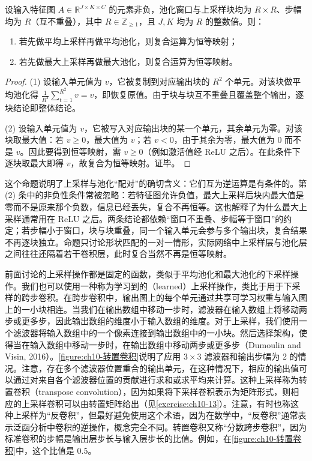 \documentclass[../../main.tex]{subfiles}
\begin{document}
\begin{proposition}[上采样与池化的复合]\label{proposition:ch10-上采样复合}
设输入特征图 $A\in\mathbb{R}^{J\times K\times C}$ 的元素非负，池化窗口与上采样块均为
$R\times R$、步幅均为 $R$（互不重叠），其中 $R\in\mathbb{Z}_{\geqslant1}$，且 $J,K$
均为 $R$ 的整数倍。则：
\begin{enumerate}
  \item 若先做平均上采样再做平均池化，则复合运算为恒等映射；
  \item 若先做最大上采样再做最大池化，则复合运算为恒等映射。
\end{enumerate}
\end{proposition}
\begin{proof}
(1) 设输入单元值为 $v$，它被复制到对应输出块的 $R^2$ 个单元。对该块做平均池化得 $\frac{1}{R^2}\sum_{t=1}^{R^2}v=v$，即恢复原值。由于块与块互不重叠且覆盖整个输出，逐块结论即整体结论。

(2) 设输入单元值为 $v$，它被写入对应输出块的某一个单元，其余单元为零。对该块取最大值：若 $v\geqslant0$，最大值为 $v$；若 $v<0$，由于其余为零，最大值为 $0$ 而不是 $v$。因此要得到恒等映射，需 $v\geqslant0$（例如激活值经 ReLU 之后）。在此条件下逐块取最大即得 $v$，故复合为恒等映射。证毕。
\end{proof}

\begin{remark}
这个命题说明了上采样与池化“配对”的确切含义：它们互为逆运算是有条件的。第 (2) 条中的非负性条件常被忽略：若特征图允许负值，最大上采样后块内最大值是零而不是原来那个负数，信息已经丢失，复合不再恒等。这也解释了为什么最大上采样通常用在 ReLU 之后。两条结论都依赖“窗口不重叠、步幅等于窗口”的约定；若步幅小于窗口，块与块重叠，同一个输入单元会参与多个输出块，复合结果不再逐块独立。命题只讨论形状匹配的一对一情形，实际网络中上采样层与池化层之间往往还隔着若干卷积层，此时复合当然不再是恒等映射。
\end{remark}

前面讨论的上采样操作都是固定的函数，类似于平均池化和最大池化的下采样操作。我们也可以使用一种称为学习到的（learned）上采样操作，类比于用于下采样的跨步卷积。在跨步卷积中，输出图上的每个单元通过共享可学习权重与输入图上的一小块相连。当我们在输出数组中移动一步时，滤波器在输入数组上将移动两步或更多步，因此输出数组的维度小于输入数组的维度。对于上采样，我们使用一个滤波器将输入数组中的一个像素连接到输出数组中的一小块。然后选择架构，使得当在输入数组中移动一步时，在输出数组中移动两步或更多步（Dumoulin and Visin, 2016）。\cref{figure:ch10-转置卷积}说明了应用 $3\times 3$ 滤波器和输出步幅为 2 的情况。注意，存在多个滤波器位置重合的输出单元，在这种情况下，相应的输出值可以通过对来自各个滤波器位置的贡献进行求和或求平均来计算。这种上采样称为转置卷积（transpose convolution），因为如果将下采样卷积表示为矩阵形式，则相应的上采样卷积可以由转置矩阵给出（见\cref{exercise:ch10-13}）。注意，有时也称这种上采样为“反卷积”，但最好避免使用这个术语，因为在数学中，“反卷积”通常表示泛函分析中卷积的逆操作，概念完全不同。转置卷积又称“分数跨步卷积”，因为标准卷积的步幅是输出层步长与输入层步长的比值。例如，在\cref{figure:ch10-转置卷积}中，这个比值是 $0.5$。
\end{document}
